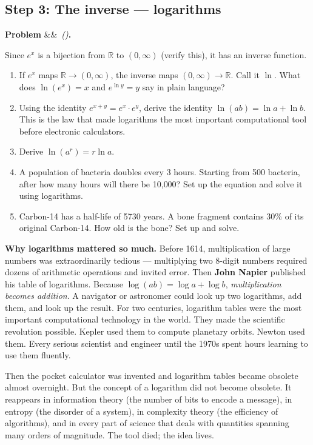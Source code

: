 \documentclass[12pt, a4paper]{article}
\newcounter{problem}
\newenvironment{problem}[1][]{%
  \refstepcounter{problem}%
  \par\vspace{6pt}%
  \noindent\textbf{\color{MidBlue}Problem \theproblem}%
  \ifx&#1&\else\ \textit{(#1)}\fi\textbf{.}\enskip
}{\par\vspace{4pt}}
\begin{document}
\subsection{Step 3: The inverse --- logarithms}

\begin{problem}
\label{prob:log}
Since $e^x$ is a bijection from $\mathbb{R}$ to $(0, \infty)$ (verify this), it has an inverse function.
\begin{enumerate}[label=(\alph*), topsep=2pt]
  \item If $e^x$ maps $\mathbb{R} \to (0,\infty)$, the inverse maps $(0,\infty) \to \mathbb{R}$. Call it $\ln$. What does $\ln(e^x) = x$ and $e^{\ln y} = y$ say in plain language?
  \item Using the identity $e^{x+y} = e^x \cdot e^y$, derive the identity $\ln(ab) = \ln a + \ln b$. This is the law that made logarithms the most important computational tool before electronic calculators.
  \item Derive $\ln(a^r) = r \ln a$.
  \item A population of bacteria doubles every 3 hours. Starting from 500 bacteria, after how many hours will there be 10{,}000? Set up the equation and solve it using logarithms.
  \item Carbon-14 has a half-life of 5730 years. A bone fragment contains 30\% of its original Carbon-14. How old is the bone? Set up and solve.
\end{enumerate}
\end{problem}

\begin{thought}
\textbf{Why logarithms mattered so much.}
Before 1614, multiplication of large numbers was extraordinarily tedious --- multiplying two 8-digit numbers required dozens of arithmetic operations and invited error. Then \textbf{John Napier} published his table of logarithms. Because $\log(ab) = \log a + \log b$, \emph{multiplication becomes addition}. A navigator or astronomer could look up two logarithms, add them, and look up the result. For two centuries, logarithm tables were the most important computational technology in the world. They made the scientific revolution possible. Kepler used them to compute planetary orbits. Newton used them. Every serious scientist and engineer until the 1970s spent hours learning to use them fluently.

Then the pocket calculator was invented and logarithm tables became obsolete almost overnight. But the concept of a logarithm did not become obsolete. It reappears in information theory (the number of bits to encode a message), in entropy (the disorder of a system), in complexity theory (the efficiency of algorithms), and in every part of science that deals with quantities spanning many orders of magnitude. The tool died; the idea lives.
\end{thought}
\end{document}
